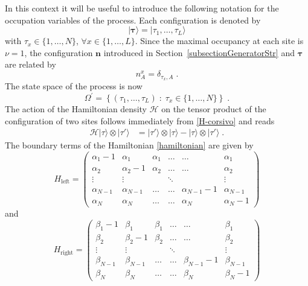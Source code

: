 \documentclass[10pt]{article}
\numberwithin{equation}{section}
\numberwithin{equation}{subsection}
\newcommand{\dt}{\;.}
\begin{document}
 In this context it will be useful to introduce the following notation for the occupation variables of the process. Each configuration is denoted by
\begin{equation}\label{Tau-Notation}
	|\bm{\tau}\rangle=|\tau_{1},\ldots,\tau_{L}\rangle
\end{equation} 
with $\tau_{x}\in \{1,\ldots,N\}$, $\forall x\in \{1,\ldots,L\}$. Since the {\color{blue} maximal occupancy at each site is $\nu=1$},
the configuration $\bm{n}$ introduced in Section~\ref{subsectionGeneratorStr} and $\bm{\tau}$ are related by 
\begin{equation}\label{notation-change-relation}
	n_{A}^{x}=\delta_{\tau_{x},A}\dt
\end{equation}
The state space of the process is now 
\begin{equation}
	\Omega^{'}=\left\{(\tau_{1},\ldots,\tau_{L})\;:\; \tau_{x}\in\{1,\ldots,N\}\right\}\dt
\end{equation}
The action of the Hamiltonian density $\mathcal{H}$ on the tensor product of the configuration of two sites follows immediately from \eqref{H-corsivo} and reads
\begin{equation}
	\begin{split}
		\mathcal{H}| \tau\rangle\otimes   |\tau'\rangle&=|\tau'\rangle \otimes |\tau\rangle-|\tau\rangle \otimes|\tau'\rangle\dt
	\end{split}
\end{equation}
The boundary terms of the Hamiltonian \eqref{hamiltonian}  are given by 
\begin{equation}
	H_{\text{left}}=\begin{pmatrix}
		\alpha_{1}-1&\alpha_{1}&\alpha_{1}&\ldots&\ldots&\alpha_{1}\\
		\alpha_{2}&\alpha_{2}-1&\alpha_{2}&\ldots&\ldots&\alpha_{2}\\
		\vdots&\vdots& &\ddots& &\vdots\\
		\alpha_{N-1}&\alpha_{N-1}&\ldots&\ldots&\alpha_{N-1}-1&\alpha_{N-1}\\
		\alpha_{N}&\alpha_{N}&\ldots&\ldots&\alpha_{N}&\alpha_{N}-1
	\end{pmatrix}
\end{equation}
and 
\begin{equation}
	H_{\text{right}}=\begin{pmatrix}
		\beta_{1}-1&\beta_{1}&\beta_{1}&\ldots&\ldots&\beta_{1}\\
		\beta_{2}&\beta_{2}-1&\beta_{2}&\ldots&\ldots&\beta_{2}\\
		\vdots&\vdots& &\ddots& &\vdots\\
		\beta_{N-1}&\beta_{N-1}&\ldots&\ldots&\beta_{N-1}-1&\beta_{N-1}\\
		\beta_{N}&\beta_{N}&\ldots&\ldots&\beta_{N}&\beta_{N}-1
	\end{pmatrix}
\end{equation}
\end{document}
